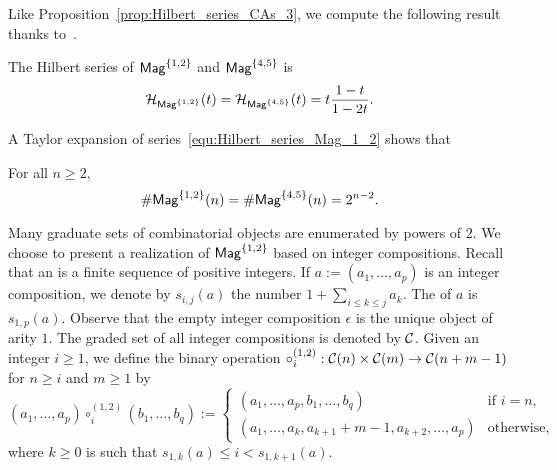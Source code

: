 Like Proposition~\ref{prop:Hilbert_series_CAs_3}, we compute the
following result thanks to~\cite{Gir18}.
\medbreak

\begin{Proposition} \label{prop:Hilbert_series_Mag_1_2}
    The Hilbert series of $\mathsf{Mag}^{\{1, 2\}}$ and $\mathsf{Mag}^{\{4, 5\}}$ is
    \begin{equation} \label{equ:Hilbert_series_Mag_1_2}
        \mathcal{H}_{\mathsf{Mag}^{\{1, 2\}}}(t)
        = \mathcal{H}_{\mathsf{Mag}^{\{4, 5\}}}(t) =
        t \frac{1 - t}{1 - 2t}.
    \end{equation}
\end{Proposition}
\medbreak

A Taylor expansion of series~\eqref{equ:Hilbert_series_Mag_1_2} shows
that
\begin{Proposition} \label{prop:Close_formula_Mag_1_2}
    For all $n \geq 2,$
    \begin{equation} \label{equ:Close_formula_Mag_1_2}
        \# \mathsf{Mag}^{\{1, 2\}}(n) = \# \mathsf{Mag}^{\{4, 5\}}(n) = 2^{n-2}.
    \end{equation}
\end{Proposition}
\medbreak

Many graduate sets of combinatorial objects are enumerated by powers of
$2$. We choose to present a realization of $\mathsf{Mag}^{\{1, 2\}}$ based on
integer compositions. Recall that an  is
a finite sequence of positive integers. If
$a := \left(a_1, \dots, a_p\right)$ is an integer composition,
we denote by $s_{i, j}(a)$ the number $1 + \sum_{i \leq k \leq j} a_k$.
The  of $a$ is $s_{1, p}(a)$. Observe that the empty
integer composition $\epsilon$ is the unique object of arity $1$.
The graded set of all integer compositions is denoted by
$\mathcal{C}$.
\medbreak
Given an integer $i \geq 1$, we define the binary operation
\begin{math}
    \circ_i^{(1,2)} : \mathcal{C}(n) \times \mathcal{C}(m)
    \to\mathcal{C}(n + m - 1)
\end{math}
for $n \geq i$ and $m \geq 1$ by
\begin{equation}
    \left(a_1, \dots, a_p\right) \circ_i^{(1,2)}
    \left(b_1, \dots, b_{q}\right)
    :=
    \begin{cases}
        \left(a_1, \dots ,a_{p}, b_1, \dots ,b_{q}\right) &
        \mbox{if } i = n, \\
        \left(a_1, \dots, a_{k}, a_{k+1} + m - 1, a_{k + 2}, \dots,
            a_p\right)
            & \mbox{otherwise},
    \end{cases}
\end{equation}
where $k \geq 0$ is such that $s_{1, k}(a) \leq i < s_{1, k + 1}(a)$.
\medbreak

